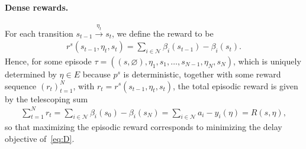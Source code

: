 \documentclass[a4paper]{report}
\theoremstyle{definition}
\theoremstyle{plain}
\begin{document}
\paragraph{Dense rewards.}
For each transition $s_{t-1} \xrightarrow{\eta_{t}} s_{t}$, we define the reward to
be
\begin{align}
  r^s(s_{t-1}, \eta_t, s_t) = \sum_{i \in \mathcal{N}} \beta_{i}(s_{t-1}) - \beta_{i}(s_t) .
\end{align}
Hence, for some episode
$\tau = ((s, \varnothing), \eta_1, s_1, \dots, s_{N-1}, \eta_N, s_N)$, which is
uniquely determined by $\eta \in E$ because $p^s$ is deterministic, together
with some reward sequence ${(r_t)}_{t=1}^N$, with
$r_t = r^s(s_{t-1}, \eta_t, s_t)$, the total episodic reward is given by the
telescoping sum
\begin{align}
  \sum_{t=1}^{N} r_{t} = \sum_{i \in \mathcal{N}} \beta_{i}(s_0) - \beta_{i}(s_N)  = \sum_{i \in \mathcal{N}} a_{i} - y_{i}(\eta) = R(s, \eta) ,
\end{align}
so that maximizing the episodic reward corresponds to minimizing the delay
objective of~\eqref{eq:D}.
\end{document}
